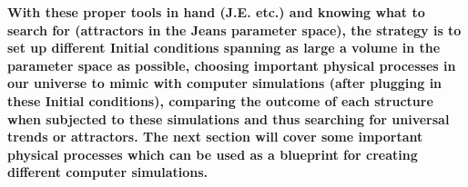\textbf{With these proper tools in hand (J.E. etc.) and knowing what to search for (attractors in the Jeans parameter space), the strategy is to set up different Initial conditions spanning as large a volume in the parameter space as possible, choosing important physical processes in our universe to mimic with computer simulations (after plugging in these Initial conditions), comparing the outcome of each structure when subjected to these simulations and thus searching for universal trends or attractors. The next section will cover some important physical processes which can be used as a blueprint for creating different computer simulations.}